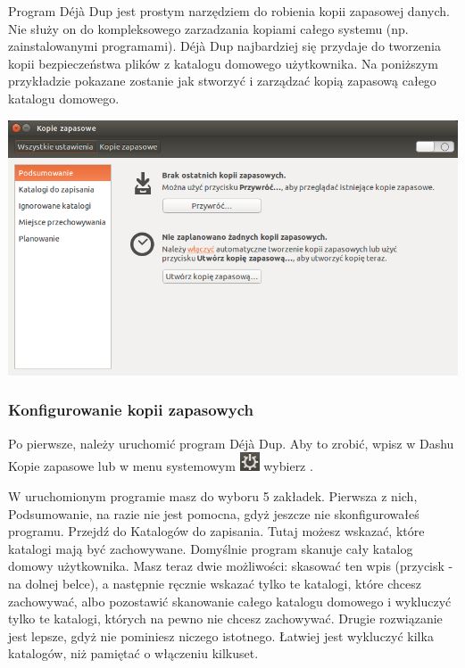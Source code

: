 Program \textcolor{ubuntu_orange}{Déjà Dup} jest prostym narzędziem do robienia kopii zapasowej danych. Nie służy on do kompleksowego zarzadzania kopiami całego systemu (np. zainstalowanymi programami). Déjà Dup najbardziej się przydaje do tworzenia kopii bezpieczeństwa plików z katalogu domowego użytkownika. Na poniższym przykładzie pokazane zostanie jak stworzyć i zarządzać kopią zapasową całego katalogu domowego.

\begin{center}
	\includegraphics[width=\linewidth]{images/programy_dejavu1.png}
\end{center}

\subsubsection{Konfigurowanie kopii zapasowych}
Po pierwsze, należy uruchomić program Déjà Dup. Aby to zrobić, wpisz w Dashu \textcolor{ubuntu_orange}{Kopie zapasowe} lub w menu systemowym \includegraphics{images/ikony_zasilanie.png} wybierz .

W uruchomionym programie masz do wyboru 5 zakładek. Pierwsza z nich, \textcolor{ubuntu_orange}{Podsumowanie}, na razie nie jest pomocna, gdyż jeszcze nie skonfigurowałeś programu. Przejdź do \textcolor{ubuntu_orange}{Katalogów do zapisania}. Tutaj możesz wskazać, które katalogi mają być zachowywane. Domyślnie program skanuje cały katalog domowy użytkownika. Masz teraz dwie możliwości: skasować ten wpis (przycisk \textcolor{ubuntu_orange}{-} na dolnej belce), a następnie ręcznie wskazać tylko te katalogi, które chcesz zachowywać, albo pozostawić skanowanie całego katalogu domowego i wykluczyć tylko te katalogi, których na pewno nie chcesz zachowywać. Drugie rozwiązanie jest lepsze, gdyż nie pominiesz niczego istotnego. Łatwiej jest wykluczyć kilka katalogów, niż pamiętać o włączeniu kilkuset.


